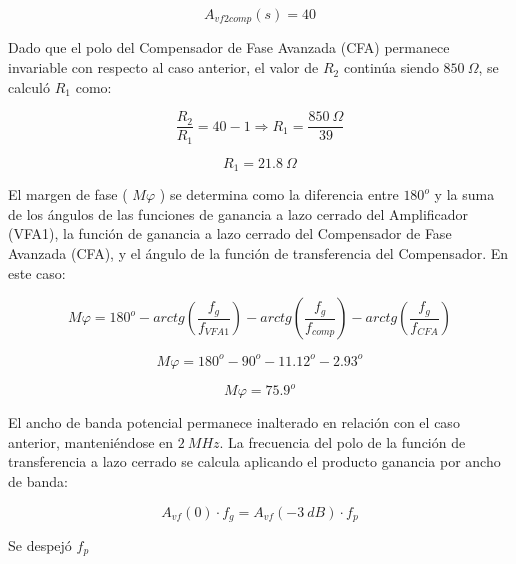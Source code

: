 \documentclass[12pt,A4paper,titlepage]{article}
\begin{document}
\begin{equation}
    \boxed{
    A_{vf2 comp} (s) = 40
    }
\end{equation}

\hspace{1mm} Dado que el polo del Compensador de Fase Avanzada (CFA) permanece invariable con respecto al caso anterior, el valor de \(R_2\) continúa siendo \(850~\Omega\), se calculó \(R_1\) como:

\begin{equation}
    \frac{R_2}{R_1} = 40 - 1 \Longrightarrow R_1 = \frac{850~\Omega}{39}
\end{equation}

\begin{equation}
    \boxed{
    R_1 = 21.8~\Omega
    }
\end{equation}

\hspace{1mm} El margen de fase ( \(M\varphi\) ) se determina como la diferencia entre \(180^o\) y la suma de los ángulos de las funciones de ganancia a lazo cerrado del Amplificador (VFA1), la función de ganancia a lazo cerrado del Compensador de Fase Avanzada (CFA), y el ángulo de la función de transferencia del Compensador. En este caso:

\begin{equation}
    M\varphi = 180^o - arctg \left(  \frac{f_g}{f_{VFA1}}\right) - arctg \left( \frac{f_g}{f_{comp}} \right) - arctg \left( \frac{f_g}{f_{CFA}} \right)
\end{equation}

\begin{equation}
   M\varphi = 180^o - 90^o - 11.12^o - 2.93^o
\end{equation}

\begin{equation}
    \boxed{
    M\varphi = 75.9^o
    }
\end{equation}

\hspace{1mm} El ancho de banda potencial permanece inalterado en relación con el caso anterior, manteniéndose en \(2~MHz\). La frecuencia del polo de la función de transferencia a lazo cerrado se calcula aplicando el producto ganancia por ancho de banda:

\begin{equation}
    A_{vf} (0) \cdot f_g = A_{vf}(-3~dB) \cdot f_p
\end{equation}

\newpage
\hspace{1mm} Se despejó \(f_p\)
\end{document}
